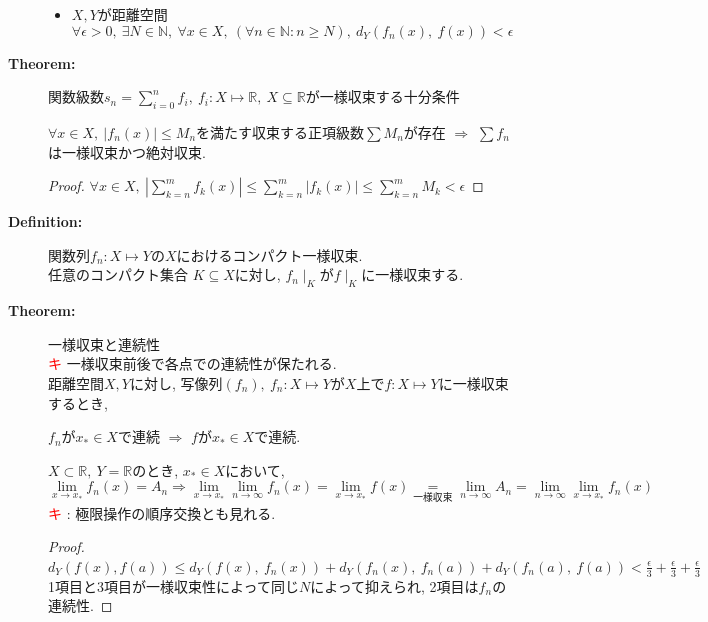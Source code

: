 \documentclass[dvipdfmx]{jsarticle}
\newcommand{\point}{\textcircled{\textcolor{red}{\scriptsize キ}} }
\begin{document}
\begin{description}
\begin{itemize}
        \item $X, Y$が距離空間
        $$\forall \epsilon > 0,\ \exists N \in \mathbb{N},\ \forall x \in X,\ (\forall n \in \mathbb{N} : n \geq N),\ d_Y(f_n(x),\ f(x) ) < \epsilon$$
    \end{itemize}

    \item[\bf{Theorem:}] 関数級数$s_n = \sum_{i=0}^n f_i,\ f_i: X \mapsto \mathbb{R},\ X \subseteq \mathbb{R}$が一様収束する十分条件
        \begin{center} $\forall x \in X,\ |f_n(x)| \leq M_n$を満たす収束する正項級数$\sum M_n$が存在 $\Rightarrow$ $\sum f_n$は一様収束かつ絶対収束. \end{center}
        \begin{proof}
            $\forall x \in X,\ | \sum_{k=n}^m f_k(x) | \leq \sum_{k=n}^m |f_k(x)| \leq \sum_{k=n}^m M_k < \epsilon$
        \end{proof}
    \item[\bf{Definition:}] 関数列$f_n: X \mapsto Y$の$X$におけるコンパクト一様収束. \\
        任意のコンパクト集合 $K \subseteq X$に対し, $f_n \mid_K$が$f \mid_K$に一様収束する.
        
    \item[\bf{Theorem:}] 一様収束と連続性 \\
        \point 一様収束前後で各点での連続性が保たれる. \\
        距離空間$X, Y$に対し, 写像列$(f_n),\ f_n: X \mapsto Y$が$X$上で$f: X \mapsto Y$に一様収束するとき, 
        \begin{center} $f_n$が$x_* \in X$で連続 $\Rightarrow$ $f$が$x_* \in X$で連続. \end{center}
        $ X \subset \mathbb{R},\ Y = \mathbb{R} $のとき, $x_* \in X$において, 
        $$ \lim_{x \to x_{*}} f_n(x) = A_n \Rightarrow \lim_{x \to x_{*}} \lim_{n \to \infty} f_n(x) = \lim_{x \to x_{*}} f(x)  \underset{一様収束}{=} \lim_{n \to \infty} A_n = \lim_{n \to \infty} \lim_{x \to x_{*}} f_n(x) $$
        \point : 極限操作の順序交換とも見れる. \\
        \begin{proof}
            $d_Y(f(x), f(a)) \leq d_Y(f(x),\ f_n(x)) + d_Y(f_n(x),\ f_n(a)) + d_Y(f_n(a),\ f(a)) < \frac{\epsilon}{3} + \frac{\epsilon}{3} + \frac{\epsilon}{3}$ \\
            1項目と3項目が一様収束性によって同じ$N$によって抑えられ, 2項目は$f_n$の連続性.
        \end{proof}
    

\end{description}
\end{document}

